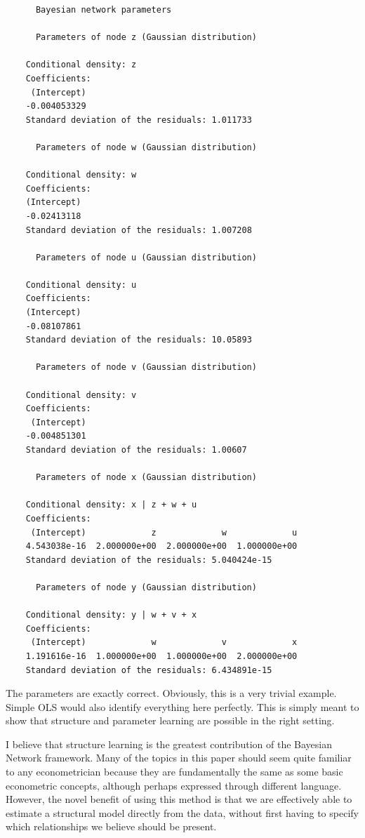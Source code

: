 \documentclass{article}
\begin{document}
\begin{verbatim}
      Bayesian network parameters
    
      Parameters of node z (Gaussian distribution)
    
    Conditional density: z
    Coefficients:
     (Intercept)  
    -0.004053329  
    Standard deviation of the residuals: 1.011733 
    
      Parameters of node w (Gaussian distribution)
    
    Conditional density: w
    Coefficients:
    (Intercept)  
    -0.02413118  
    Standard deviation of the residuals: 1.007208 
    
      Parameters of node u (Gaussian distribution)
    
    Conditional density: u
    Coefficients:
    (Intercept)  
    -0.08107861  
    Standard deviation of the residuals: 10.05893 
    
      Parameters of node v (Gaussian distribution)
    
    Conditional density: v
    Coefficients:
     (Intercept)  
    -0.004851301  
    Standard deviation of the residuals: 1.00607 
    
      Parameters of node x (Gaussian distribution)
    
    Conditional density: x | z + w + u
    Coefficients:
     (Intercept)             z             w             u  
    4.543038e-16  2.000000e+00  2.000000e+00  1.000000e+00  
    Standard deviation of the residuals: 5.040424e-15 
    
      Parameters of node y (Gaussian distribution)
    
    Conditional density: y | w + v + x
    Coefficients:
     (Intercept)             w             v             x  
    1.191616e-16  1.000000e+00  1.000000e+00  2.000000e+00  
    Standard deviation of the residuals: 6.434891e-15 
\end{verbatim}

The parameters are exactly correct. Obviously, this is a very trivial example. Simple OLS would also identify everything here perfectly. This is simply meant to show that structure and parameter learning are possible in the right setting.

I believe that structure learning is the greatest contribution of the Bayesian Network framework. Many of the topics in this paper should seem quite familiar to any econometrician because they are fundamentally the same as some basic econometric concepts, although perhaps expressed through different language. However, the novel benefit of using this method is that we are effectively able to estimate a structural model directly from the data, without first having to specify which relationships we believe should be present.
\end{document}
